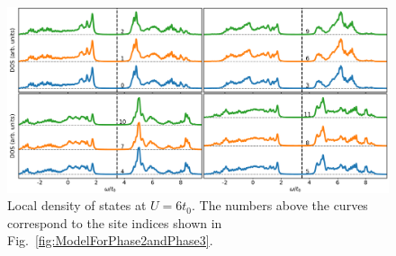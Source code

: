 \documentclass[aps,prb,amsfonts,amsmath,amssymb,showpacs,groupedaddress,superscriptaddress]{revtex4-1}
\begin{document}
\begin{figure}[p]
    \includegraphics[width=0.8\columnwidth]{fig/CPTForPhase2andPhase3LDOS.pdf}
    \caption{\label{fig:CPTForPhase2andPhase3LDOS} Local density of states at $U = 6 t_{0}$. The numbers above the curves correspond to the site indices shown in Fig.~\ref{fig:ModelForPhase2andPhase3}.}
\end{figure}


\end{document}
